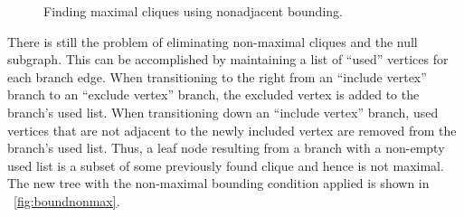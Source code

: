 \begin{figure}[H]
  \centering
  \caption{Finding maximal cliques using nonadjacent bounding.}
  \label{fig:boundnonadj}
\end{figure}

There is still the problem of eliminating non-maximal cliques and the null subgraph.  This can be accomplished by
maintaining a list of ``used'' vertices for each branch edge.  When transitioning to the right from an ``include
vertex'' branch to an ``exclude vertex'' branch, the excluded vertex is added to the branch's used list.  When
transitioning down an ``include vertex'' branch, used vertices that are not adjacent to the newly included vertex
are removed from the branch's used list.  Thus, a leaf node resulting from a branch with a non-empty used list is a
subset of some previously found clique and hence is not maximal.  The new tree with the non-maximal bounding
condition applied is shown in \figurename~\ref{fig:boundnonmax}.

